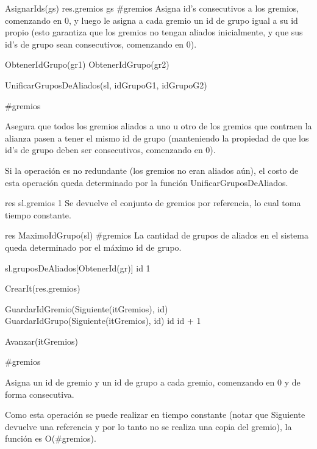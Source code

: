 {
	\state AsignarIds(gs)								
	\state res.gremios \asig gs 						
}
{\#gremios}
{Asigna id's consecutivos a los gremios, comenzando en 0, y luego le asigna a cada gremio un id de grupo igual a su id propio (esto garantiza que los gremios no tengan aliados inicialmente, y que sus id's de grupo sean consecutivos, comenzando en 0). }

{
	\state {} \asig ObtenerIdGrupo(gr1)						
	\state {} \asig ObtenerIdGrupo(gr2)						
	\state 

													
		\state UnificarGruposDeAliados(sl, idGrupoG1, idGrupoG2)					
	\endif
}
{\#gremios}
{ Asegura que todos los gremios aliados a uno u otro de los gremios que contraen la alianza pasen a tener el mismo id de grupo (manteniendo la propiedad de que los id's de grupo deben ser consecutivos, comenzando en 0).

\hspace{10pt} Si la operaci\'on es no redundante (los gremios no eran aliados a\'un), el costo de esta operaci\'on queda determinado por la funci\'on UnificarGruposDeAliados. }

{
	\state res \asig sl.gremios								
}
{1}
{ Se devuelve el conjunto de gremios por referencia, lo cual toma tiempo constante. }

{
	\state res \asig MaximoIdGrupo(sl)						
}
{\#gremios}
{La cantidad de grupos de aliados en el sistema queda determinado por el m\'aximo id de grupo.}

{
	\state sl.gruposDeAliados[ObtenerId(gr)] \asig id			
}
{1}
{}

{
	\state {} 											
	\state

	\state {} \asig CrearIt(res.gremios)		
		\state
		
		\state GuardarIdGremio(Siguiente(itGremios), id)					
		\state GuardarIdGrupo(Siguiente(itGremios), id)						
		\state id \asig id + 1												
		
		\state
		\state Avanzar(itGremios)											
	\endwhile
}
{ \#gremios }
{ Asigna un id de gremio y un id de grupo a cada gremio, comenzando en 0 y de forma consecutiva.

\hspace{10pt} Como esta operaci\'on se puede realizar en tiempo constante (notar que Siguiente devuelve una referencia y por lo tanto no se realiza una copia del gremio), la funci\'on es O(\#gremios). }

